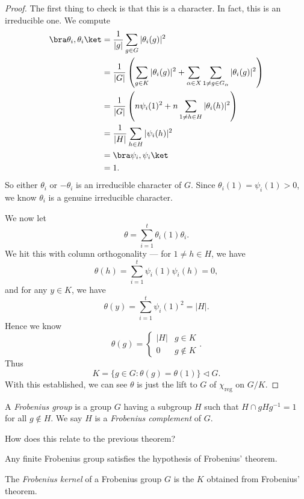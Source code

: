 \documentclass[a4paper]{article}
\begin{document}
\begin{proof}
  The first thing to check is that this is a character. In fact, this is an irreducible one. We compute
  \begin{align*}
    \bra \theta_i, \theta_i\ket &= \frac{1}{|g|} \sum_{g \in G} |\theta_i(g)|^2\\
    &= \frac{1}{|G|} \left(\sum_{g \in K} |\theta_i(g)|^2 + \sum_{\alpha \in X}\sum_{1 \not= g \in G_\alpha}|\theta_i(g)|^2\right)\\
    &= \frac{1}{|G|} \left(n \psi_i(1)^2 + n \sum_{1 \not= h \in H} |\theta_i (h)|^2\right)\\
    &= \frac{1}{|H|} \sum_{h \in H} |\psi_i(h)|^2\\
    &= \bra \psi_i, \psi_i \ket\\
    &= 1.
  \end{align*}
  So either $\theta_i$ or $-\theta_i$ is an irreducible character of $G$. Since $\theta_i(1) = \psi_i(1) > 0$, we know $\theta_i$ is a genuine irreducible character.

  We now let
  \[
    \theta = \sum_{i = 1}^t \theta_i(1) \theta_i.
  \]
  We hit this with column orthogonality --- for $1 \not= h \in H$, we have
  \[
    \theta(h) = \sum_{i = 1}^t \psi_i(1) \psi_i(h) = 0,
  \]
  and for any $y \in K$, we have
  \[
    \theta(y) = \sum_{i = 1}^t \psi_i(1)^2 = |H|.
  \]
  Hence we know
  \[
    \theta(g) =
    \begin{cases}
      |H| & g \in K\\
      0 & g \not\in K
    \end{cases}.
  \]
  Thus
  \[
    K = \{g \in G: \theta(g) = \theta(1)\} \lhd G.
  \]
  With this established, we can see $\theta$ is just the lift to $G$ of $\chi_{\mathrm{reg}}$ on $G/K$.
\end{proof}

\begin{defi}
  A \emph{Frobenius group} is a group $G$ having a subgroup $H$ such that $H\cap gHg^{-1} = 1$ for all $g \not\in H$. We say $H$ is a \emph{Frobenius complement} of $G$.
\end{defi}
How does this relate to the previous theorem?

\begin{prop}
  Any finite Frobenius group satisfies the hypothesis of Frobenius' theorem.
\end{prop}

\begin{defi}
  The \emph{Frobenius kernel} of a Frobenius group $G$ is the $K$ obtained from Frobenius' theorem.
\end{defi}
\end{document}
